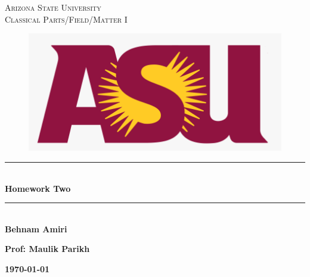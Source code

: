\documentclass[fleqn]{article}
\begin{document}
  \begin{titlepage}

    \newcommand{\HRule}{\rule{\linewidth}{0.5mm}}

    \center


    \textsc{\LARGE Arizona State University}\\[1.5cm]

    \textsc{\LARGE Classical Parts/Field/Matter I}\\[1.5cm]


    \begin{figure}
      \includegraphics[width=\linewidth]{asu.png}
    \end{figure}


    \HRule \\[0.4cm]
    { \huge \bfseries Homework Two}\\[0.4cm] 
    \HRule \\[1.5cm]

    \textbf{Behnam Amiri}

    \bigbreak

    \textbf{Prof: Maulik Parikh}

    \bigbreak


    \textbf{{\large \today}\\[2cm]}

    \vfill

  \end{titlepage}
\end{document}
